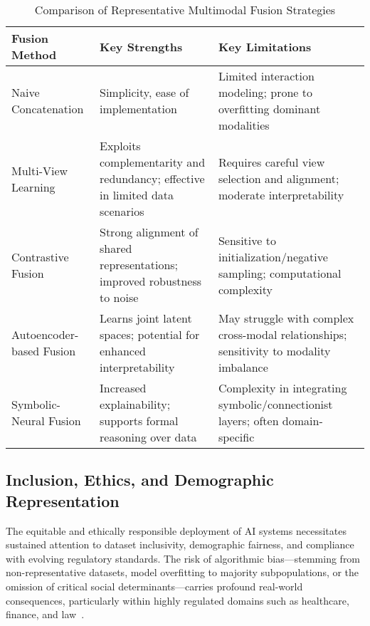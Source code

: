 \begin{table*}[htbp]
\centering
\caption{Comparison of Representative Multimodal Fusion Strategies}
\label{tab:fusion_comparison}
\begin{adjustbox}{max width=\textwidth}
\begin{tabular}{lll}
\toprule
\textbf{Fusion Method} & \textbf{Key Strengths} & \textbf{Key Limitations} \\
\midrule
Naive Concatenation & Simplicity, ease of implementation & Limited interaction modeling; prone to overfitting dominant modalities \\
Multi-View Learning & Exploits complementarity and redundancy; effective in limited data scenarios & Requires careful view selection and alignment; moderate interpretability \\
Contrastive Fusion & Strong alignment of shared representations; improved robustness to noise & Sensitive to initialization/negative sampling; computational complexity \\
Autoencoder-based Fusion & Learns joint latent spaces; potential for enhanced interpretability & May struggle with complex cross-modal relationships; sensitivity to modality imbalance \\
Symbolic-Neural Fusion & Increased explainability; supports formal reasoning over data & Complexity in integrating symbolic/connectionist layers; often domain-specific\\
\bottomrule
\end{tabular}
\end{adjustbox}
\end{table*}

\subsection{Inclusion, Ethics, and Demographic Representation}

The equitable and ethically responsible deployment of AI systems necessitates sustained attention to dataset inclusivity, demographic fairness, and compliance with evolving regulatory standards. The risk of algorithmic bias—stemming from non-representative datasets, model overfitting to majority subpopulations, or the omission of critical social determinants—carries profound real-world consequences, particularly within highly regulated domains such as healthcare, finance, and law~\cite{ref1,ref2,ref10,ref21,ref22,ref23,ref42,ref43,ref44,ref49,ref52,ref53,ref65}.

